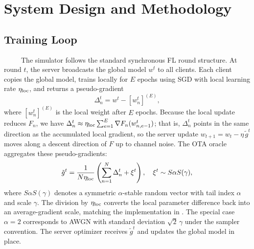 \chapter{System Design and Methodology}

\section{Training Loop}
\ \ \ \ \, The simulator follows the standard synchronous FL round structure.
At round $t$, the server broadcasts the global model $w^t$ to all
clients. Each client copies the global model, trains locally for $E$
epochs using SGD with local learning rate $\eta_{\rm loc}$, and returns
a pseudo-gradient
\begin{equation}
    \Delta_n^t = w^t - [w_n^t]^{(E)},
\end{equation}
where $[w_n^t]^{(E)}$ is the local weight after $E$ epochs. Because the
local update reduces $F_n$, we have
$\Delta_n^t \approx \eta_{\rm loc}\sum_{e=1}^{E} \nabla F_n(w_{n,e-1}^t)$;
that is, $\Delta_n^t$ points in the same direction as the accumulated
local gradient, so the server update
$w_{t+1} = w_t - \eta\, \tilde{g}^t$ moves along a descent
direction of $F$ up to channel noise. The OTA oracle aggregates these
pseudo-gradients:
\begin{equation}
    \tilde{g}^t =
    \frac{1}{N\eta_{\rm loc}}
    \left(\sum_{n=1}^{N} \Delta_n^t + \xi^t\right),
    \quad
    \xi^t \sim S\alpha S(\gamma),
\end{equation}
where $S\alpha S(\gamma)$ denotes a symmetric $\alpha$-stable random
vector with tail index $\alpha$ and scale $\gamma$. The division by
$\eta_{\rm loc}$ converts the local parameter difference back into an
average-gradient scale, matching the implementation in
. The special case $\alpha=2$
corresponds to AWGN with standard deviation $\sqrt{2}\,\gamma$ under the
sampler convention. The server optimizer receives $\tilde{g}^t$ and
updates the global model in place.

